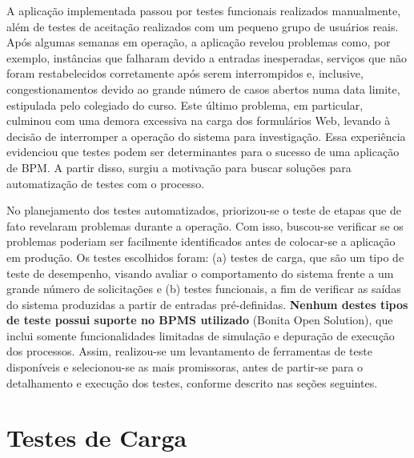 \documentclass[12pt]{article}
\begin{document}
A aplicação implementada passou por testes funcionais realizados manualmente, além de testes de aceitação realizados com um pequeno grupo de usuários reais. Após algumas semanas em operação, a aplicação revelou problemas como, por exemplo, instâncias que falharam devido a entradas inesperadas, serviços que não foram restabelecidos corretamente após serem interrompidos e, inclusive, congestionamentos devido ao grande número de casos abertos numa data limite, estipulada pelo colegiado do curso. Este último problema, em particular, culminou com uma demora excessiva na carga dos formulários Web, levando à decisão de interromper a operação do sistema para investigação. Essa experiência evidenciou que testes podem ser determinantes para o sucesso de uma aplicação de BPM. A partir disso, surgiu a motivação para buscar soluções para automatização de testes com o processo.


No planejamento dos testes automatizados, priorizou-se o teste de  etapas que de fato revelaram problemas durante a operação. Com isso, buscou-se verificar se os problemas poderiam ser facilmente identificados antes de colocar-se a aplicação em produção. Os testes escolhidos foram: (a) testes de carga, que são um tipo de teste de desempenho, visando avaliar o comportamento do sistema frente a um grande número de solicitações e (b) testes funcionais, a fim de verificar as saídas do sistema produzidas a partir de entradas pré-definidas. \textbf{Nenhum destes tipos de teste possui suporte no BPMS utilizado} (Bonita Open Solution), que inclui somente funcionalidades limitadas de simulação e depuração de execução dos processos. Assim, realizou-se um levantamento de ferramentas de teste disponíveis e selecionou-se as mais promissoras, antes de partir-se para o detalhamento e execução dos testes, conforme descrito nas seções seguintes.






\section{Testes de Carga}


\end{document}
